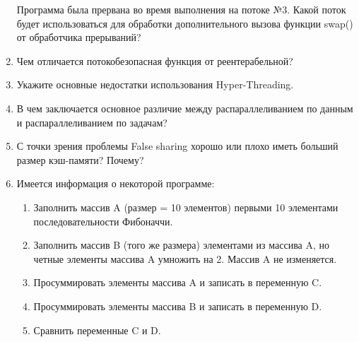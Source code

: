 \begin{enumerate}
    Программа была прервана во время выполнения на потоке №3. Какой поток будет использоваться для обработки дополнительного вызова функции swap() от обработчика прерываний?

    \item Чем отличается потокобезопасная функция от реентерабельной?

    \item Укажите основные недостатки использования Hyper-Threading.
    
    \item В чем заключается основное различие между распараллеливанием по данным и распараллеливанием по задачам?

    \item С точки зрения проблемы False sharing хорошо или плохо иметь больший размер кэш-памяти? Почему?
    

    \item Имеется информация о некоторой программе:
    \begin{enumerate}
        \item Заполнить массив A (размер = 10 элементов) первыми 10 элементами последовательности Фибоначчи. 
        \item Заполнить массив B (того же размера) элементами из массива A, но четные элементы массива A умножить на 2. Массив A не изменяется.
        \item Просуммировать элементы массива A и записать в переменную C.
        \item Просуммировать элементы массива B и записать в переменную D.
        \item Сравнить переменные C и D. 
    \end{enumerate}
    

\end{enumerate}
